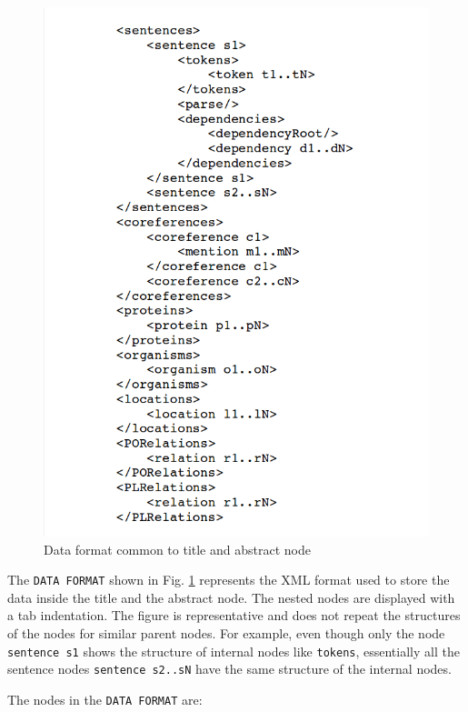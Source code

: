 \begin{enumerate}
\begin{figure}
\centering
\includegraphics[scale=0.4]{figures/XMLSchema2.png}
\caption{Data format common to title and abstract node}\label{fig:XMLSchema2}
\end{figure}

The \texttt{DATA FORMAT} shown in Fig. \ref{fig:XMLSchema2} represents the XML format used to store the data inside the title and the abstract node. The nested nodes are displayed with a tab indentation. The figure is representative and does not repeat the structures of the nodes for similar parent nodes. For example, even though only the node \texttt{sentence s1} shows the structure of internal nodes like \texttt{tokens}, essentially all the sentence nodes \texttt{sentence s2..sN} have the same structure of the internal nodes.

The nodes in the \texttt{DATA FORMAT} are:


\end{enumerate}
